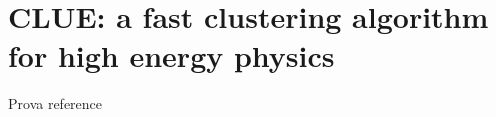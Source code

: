 \chapter{CLUE: a fast clustering algorithm for high energy physics}
\label{ch:1}
Prova reference\cite{CLUE}